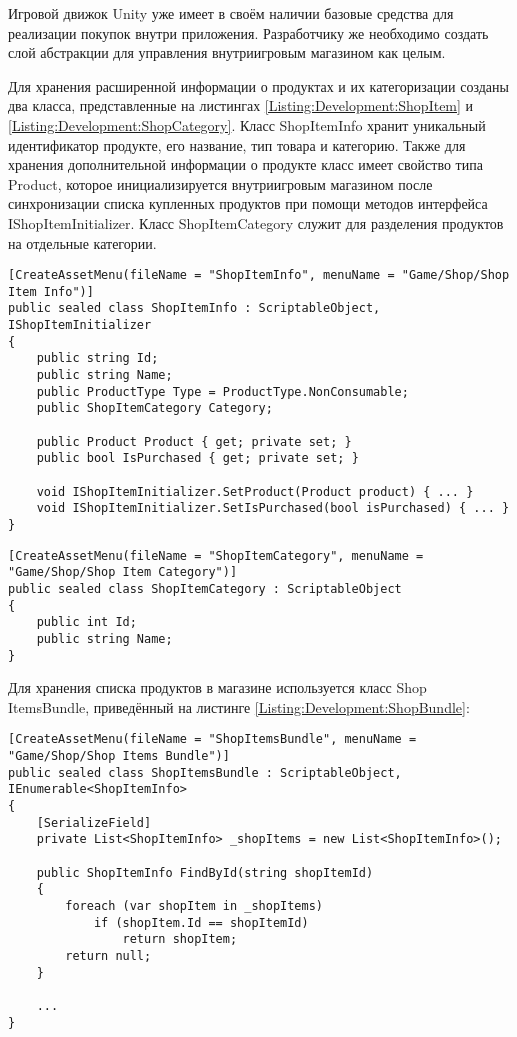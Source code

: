 Игровой движок Unity уже имеет в своём наличии базовые средства для реализации покупок внутри приложения. Разработчику же необходимо создать слой абстракции для управления внутриигровым магазином как целым.

Для хранения расширенной информации о продуктах и их категоризации созданы два класса, представленные на листингах \ref{Listing:Development:ShopItem} и \ref{Listing:Development:ShopCategory}. Класс ShopItemInfo хранит уникальный идентификатор продукте, его название, тип товара и категорию. Также для хранения дополнительной информации о продукте класс имеет свойство типа Product, которое инициализируется внутриигровым магазином после синхронизации списка купленных продуктов при помощи методов интерфейса IShopItemInitializer. Класс ShopItemCategory служит для разделения продуктов на отдельные категории.

\begin{lstlisting}[caption={Класс продукта}, label=Listing:Development:ShopItem]
[CreateAssetMenu(fileName = "ShopItemInfo", menuName = "Game/Shop/Shop Item Info")]
public sealed class ShopItemInfo : ScriptableObject, IShopItemInitializer
{
    public string Id;
    public string Name;
    public ProductType Type = ProductType.NonConsumable;
    public ShopItemCategory Category;

    public Product Product { get; private set; }
    public bool IsPurchased { get; private set; }

    void IShopItemInitializer.SetProduct(Product product) { ... }
    void IShopItemInitializer.SetIsPurchased(bool isPurchased) { ... }
}
\end{lstlisting}

\begin{lstlisting}[caption={Класс категори продукта}, label=Listing:Development:ShopCategory]
[CreateAssetMenu(fileName = "ShopItemCategory", menuName = "Game/Shop/Shop Item Category")]
public sealed class ShopItemCategory : ScriptableObject
{
    public int Id;
    public string Name;
}
\end{lstlisting}

Для хранения списка продуктов в магазине используется класс Shop \linebreak ItemsBundle, приведённый на листинге \ref{Listing:Development:ShopBundle}:

\begin{lstlisting}[caption={Класс коллекции продуктов}, label=Listing:Development:ShopBundle]
[CreateAssetMenu(fileName = "ShopItemsBundle", menuName = "Game/Shop/Shop Items Bundle")]
public sealed class ShopItemsBundle : ScriptableObject, IEnumerable<ShopItemInfo>
{
    [SerializeField]
    private List<ShopItemInfo> _shopItems = new List<ShopItemInfo>();

    public ShopItemInfo FindById(string shopItemId)
    {
        foreach (var shopItem in _shopItems)
            if (shopItem.Id == shopItemId)
                return shopItem;
        return null;
    }

    ...
}
\end{lstlisting}


